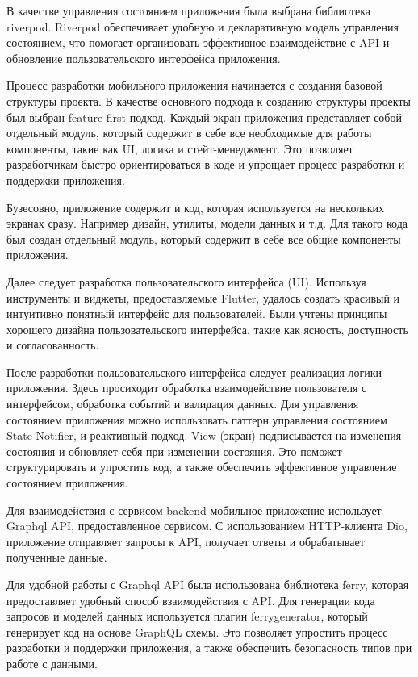 В качестве управления состоянием приложения была выбрана библиотека riverpod. 
Riverpod обеспечивает удобную и декларативную модель управления состоянием, 
что помогает организовать эффективное взаимодействие с API и обновление пользовательского интерфейса приложения.

Процесс разработки мобильного приложения начинается с создания базовой структуры проекта. 
В качестве основного подхода к созданию структуры проекты был выбран feature first подход.
Каждый экран приложения представляет собой отдельный модуль,
который содержит в себе все необходимые для работы компоненты, такие как UI, логика и стейт-менеджмент.
Это позволяет разработчикам быстро ориентироваться в коде и упрощает процесс разработки и поддержки приложения.

Бузесовно, приложение содержит и код, которая используется на нескольких экранах сразу. Например дизайн, утилиты, модели данных и т.д.
Для такого кода был создан отдельный модуль, который содержит в себе все общие компоненты приложения.

Далее следует разработка пользовательского интерфейса (UI). 
Используя инструменты и виджеты, предоставляемые Flutter, удалось создать красивый 
и интуитивно понятный интерфейс для пользователей. 
Были учтены принципы хорошего дизайна пользовательского интерфейса, 
такие как ясность, доступность и согласованность. 

После разработки пользовательского интерфейса следует реализация логики приложения.
Здесь просиходит обработка взаимодействие пользователя с интерфейсом, обработка событий и валидация данных.
Для управления состоянием приложения можно использовать паттерн управления состоянием State Notifier, и реактивный подход.
View (экран) подписывается на изменения состояния и обновляет себя при изменении состояния.
Это поможет структурировать и упростить код, а также обеспечить эффективное управление состоянием приложения.

Для взаимодействия с сервисом backend мобильное приложение использует Graphql API,
предоставленное сервисом. С использованием HTTP-клиента Dio, приложение отправляет запросы к API,
получает ответы и обрабатывает полученные данные.

Для удобной работы с Graphql API была использована библиотека ferry, которая предоставляет удобный способ взаимодействия с API.
Для генерации кода запросов и моделей данных используется плагин ferry\textunderscore generator, который генерирует код на основе GraphQL схемы.
Это позволяет упростить процесс разработки и поддержки приложения, а также обеспечить безопасность типов при работе с данными.


